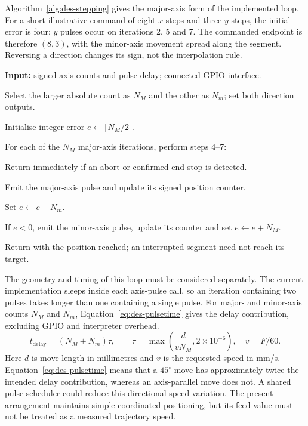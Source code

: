 Algorithm~\ref{alg:des-stepping} gives the major-axis form of the implemented loop. For a short illustrative command of eight $x$ steps and three $y$ steps, the initial error is four; $y$ pulses occur on iterations 2, 5 and 7. The commanded endpoint is therefore $(8,3)$, with the minor-axis movement spread along the segment. Reversing a direction changes its sign, not the interpolation rule.
\begin{designalgorithm}
\caption{Coordinated axis stepping with interruption checks}
\label{alg:des-stepping}
\textbf{Input:} signed axis counts and pulse delay; connected GPIO interface.
\begin{designsteps}
\item Select the larger absolute count as $N_M$ and the other as $N_m$; set both direction outputs.
\item Initialise integer error $e\leftarrow\lfloor N_M/2\rfloor$.
\item For each of the $N_M$ major-axis iterations, perform steps 4--7:
\item \quad Return immediately if an abort or confirmed end stop is detected.
\item \quad Emit the major-axis pulse and update its signed position counter.
\item \quad Set $e\leftarrow e-N_m$.
\item \quad If $e<0$, emit the minor-axis pulse, update its counter and set $e\leftarrow e+N_M$.
\item Return with the position reached; an interrupted segment need not reach its target.
\end{designsteps}
\end{designalgorithm}

The geometry and timing of this loop must be considered separately. The current implementation sleeps inside each axis-pulse call, so an iteration containing two pulses takes longer than one containing a single pulse. For major- and minor-axis counts $N_M$ and $N_m$, Equation~\ref{eq:des-pulsetime} gives the delay contribution, excluding GPIO and interpreter overhead.
\begin{equation}
t_{\mathrm{delay}}=(N_M+N_m)\tau,\qquad
\tau=\max\left(\frac{d}{vN_M},2\times10^{-6}\right),\quad v=F/60.
\label{eq:des-pulsetime}
\end{equation}
Here $d$ is move length in millimetres and $v$ is the requested speed in mm/s. Equation~\ref{eq:des-pulsetime} means that a $45^\circ$ move has approximately twice the intended delay contribution, whereas an axis-parallel move does not. A shared pulse scheduler could reduce this directional speed variation. The present arrangement maintains simple coordinated positioning, but its feed value must not be treated as a measured trajectory speed.

